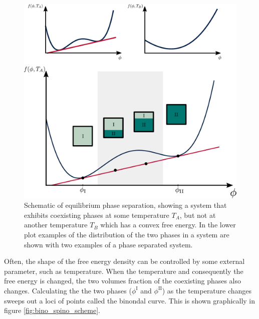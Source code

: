 \begin{figure}
    \centering
    \includegraphics[width=\textwidth]{figures/2-cips-figs/thermo_solutions.pdf}
    \caption{Schematic of equilibrium phase separation, showing a system that exhibits coexisting phases at some temperature $T_{A}$, but not at another temperature $T_{B}$ which has a convex free energy. In the lower plot examples of the distribution of the two phases in a system are shown with two examples of a phase separated system.}
    \label{fig:phase_sep_scheme}
\end{figure}

Often, the shape of the free energy density can be controlled by some external parameter, such as temperature. When the temperature and consequently the free energy is changed, the two volumes fraction of the coexisting phases also changes. Calculating the the two phases ($\phi^{\mathrm{I}}$ and $\phi^{\mathrm{II}}$) as the temperature changes sweeps out a loci of points called the binondal curve. This is shown graphically in figure \ref{fig:bino_spino_scheme}.

